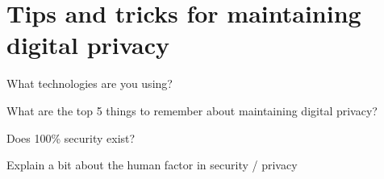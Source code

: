\documentclass{exam}
\begin{document}
\section{Tips and tricks for maintaining digital privacy}
\begin{questions}


\question What technologies are you using? 

\begin{solutionorlines}[1.5in]
\end{solutionorlines}

\question What are the top 5 things to remember about maintaining digital privacy? 
\begin{solutionorlines}[1.5in]
\end{solutionorlines}

\question Does 100\% security exist?
\begin{solutionorlines}[0.5in]
\end{solutionorlines}

\question Explain a bit about the human factor in security / privacy
\begin{solutionorlines}[0.8in]
\end{solutionorlines}

\end{questions}
\end{document}
